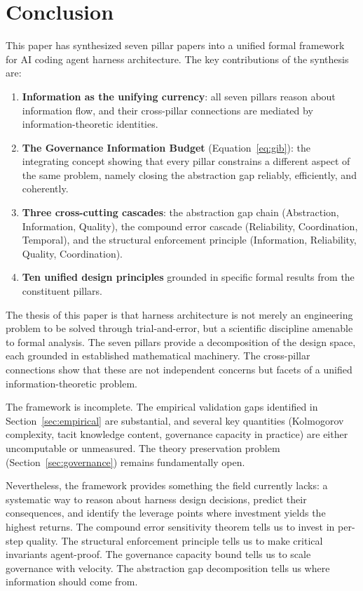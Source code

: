 \section{Conclusion}
\label{sec:conclusion}

This paper has synthesized seven pillar papers into a unified formal framework for AI coding agent harness architecture. The key contributions of the synthesis are:

\begin{enumerate}
    \item \textbf{Information as the unifying currency}: all seven pillars reason about information flow, and their cross-pillar connections are mediated by information-theoretic identities.
    \item \textbf{The Governance Information Budget} (Equation~\ref{eq:gib}): the integrating concept showing that every pillar constrains a different aspect of the same problem, namely closing the abstraction gap reliably, efficiently, and coherently.
    \item \textbf{Three cross-cutting cascades}: the abstraction gap chain (Abstraction, Information, Quality), the compound error cascade (Reliability, Coordination, Temporal), and the structural enforcement principle (Information, Reliability, Quality, Coordination).
    \item \textbf{Ten unified design principles} grounded in specific formal results from the constituent pillars.
\end{enumerate}

The thesis of this paper is that harness architecture is not merely an engineering problem to be solved through trial-and-error, but a scientific discipline amenable to formal analysis. The seven pillars provide a decomposition of the design space, each grounded in established mathematical machinery. The cross-pillar connections show that these are not independent concerns but facets of a unified information-theoretic problem.

The framework is incomplete. The empirical validation gaps identified in Section~\ref{sec:empirical} are substantial, and several key quantities (Kolmogorov complexity, tacit knowledge content, governance capacity in practice) are either uncomputable or unmeasured. The theory preservation problem (Section~\ref{sec:governance}) remains fundamentally open.

Nevertheless, the framework provides something the field currently lacks: a systematic way to reason about harness design decisions, predict their consequences, and identify the leverage points where investment yields the highest returns. The compound error sensitivity theorem tells us to invest in per-step quality. The structural enforcement principle tells us to make critical invariants agent-proof. The governance capacity bound tells us to scale governance with velocity. The abstraction gap decomposition tells us where information should come from.


